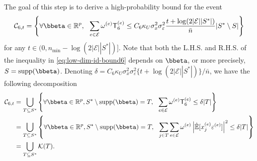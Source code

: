 \documentclass[10pt]{article}
\numberwithin{equation}{section}
\newcommand*{\supp}{\mathrm{supp}}
\begin{document}
 The goal of this step is to derive a high-probability bound for the event
\begin{align}
\label{eq:low-dim-id-bound6}
    \mathcal{C}_{6,t} = \left\{\forall \bbeta \in \mathbb{R}^p, ~~ \sum_{e\in \mathcal{E}} \omega^{(e)} \mathsf{T}_6^{(e)} \le C_6 \kappa_U \sigma_x^2\sigma_\varepsilon^2  \frac{t+ \log(2|\mathcal{E}||S^*|)}{\bar{n}} |S^*\setminus S| \right\}
\end{align} for any $t \in (0, n_{\min} - \log(2|\mathcal{E}||S^*|)]$. Note that both the L.H.S. and R.H.S. of the inequality in \eqref{eq:low-dim-id-bound6} depends on $\bbeta$, or more precisely, $S=\supp(\bbeta)$. Denoting $\delta = C_6 \kappa_U\sigma_x^2\sigma_\varepsilon^2 \{t+ \log(2|\mathcal{E}||S^*|)\}/\bar{n}$, we have the following decomposition
\begin{align*}
    \mathcal{C}_{6,t} &= \bigcup_{T\subseteq S^*} \left\{\forall \bbeta \in \mathbb{R}^p, S^*\setminus \supp(\bbeta) = T, ~~ \sum_{e\in \mathcal{E}} \omega^{(e)} \mathsf{T}_6^{(e)} \le \delta |T| \right\}\\
    &= \bigcup_{T\subseteq S^*} \left\{\forall \bbeta \in \mathbb{R}^p, S^*\setminus \supp(\bbeta) = T, ~~ \sum_{j\in T} \sum_{e\in \mathcal{E}} \omega^{(e)} \left|\hat{\mathbb{E}}[x_j^{(e)}\varepsilon^{(e)}]\right|^2 \le \delta |T| \right\} \\
    &= \bigcup_{T\subseteq S^*} \mathcal{K}(T).
\end{align*}
\end{document}
